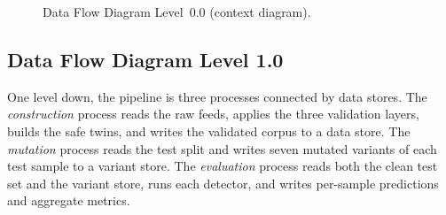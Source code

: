\begin{figure}[htb]
\centering
{}
\caption{Data Flow Diagram Level~0.0 (context diagram).}
\label{fig:dfd0}
\end{figure}

\subsection{Data Flow Diagram Level 1.0}

One level down, the pipeline is three processes connected by data stores. The
\emph{construction} process reads the raw feeds, applies the three validation
layers, builds the safe twins, and writes the validated corpus to a data store.
The \emph{mutation} process reads the test split and writes seven mutated
variants of each test sample to a variant store. The \emph{evaluation} process
reads both the clean test set and the variant store, runs each detector, and
writes per-sample predictions and aggregate metrics.

